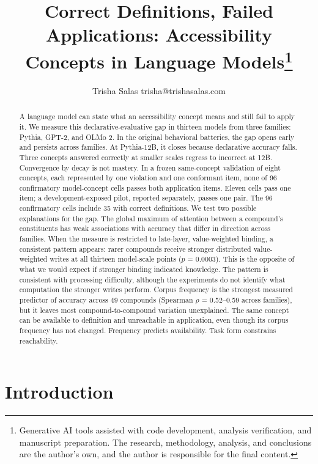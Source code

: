 \documentclass[
  english,
]{article}
\title{Correct Definitions, Failed Applications: Accessibility Concepts in Language Models\thanks{Generative AI tools assisted with code development, analysis verification, and manuscript preparation. The research, methodology, analysis, and conclusions are the author's own, and the author is responsible for the final content.}}
\author{\name Trisha Salas \email trisha@trishasalas.com}
\date{}
\newcounter{none} %
\begin{document}
\raggedbottom
\maketitle
\begin{abstract}
A language model can state what an accessibility concept means and still fail to apply it. We measure this declarative-evaluative gap in thirteen models from three families: Pythia, GPT-2, and OLMo 2. In the original behavioral batteries, the gap opens early and persists across families. At Pythia-12B, it closes because declarative accuracy falls. Three concepts answered correctly at smaller scales regress to incorrect at 12B. Convergence by decay is not mastery. In a frozen same-concept validation of eight concepts, each represented by one violation and one conformant item, none of 96 confirmatory model-concept cells passes both application items. Eleven cells pass one item; a development-exposed pilot, reported separately, passes one pair. The 96 confirmatory cells include 35 with correct definitions. We test two possible explanations for the gap. The global maximum of attention between a compound's constituents has weak associations with accuracy that differ in direction across families. When the measure is restricted to late-layer, value-weighted binding, a consistent pattern appears: rarer compounds receive stronger distributed value-weighted writes at all thirteen model-scale points (\(p\) = 0.0003). This is the opposite of what we would expect if stronger binding indicated knowledge. The pattern is consistent with processing difficulty, although the experiments do not identify what computation the stronger writes perform. Corpus frequency is the strongest measured predictor of accuracy across 49 compounds (Spearman \(\rho\) = 0.52--0.59 across families), but it leaves most compound-to-compound variation unexplained. The same concept can be available to definition and unreachable in application, even though its corpus frequency has not changed. Frequency predicts availability. Task form constrains reachability.
\end{abstract}

\section{Introduction}\label{introduction}
\end{document}
